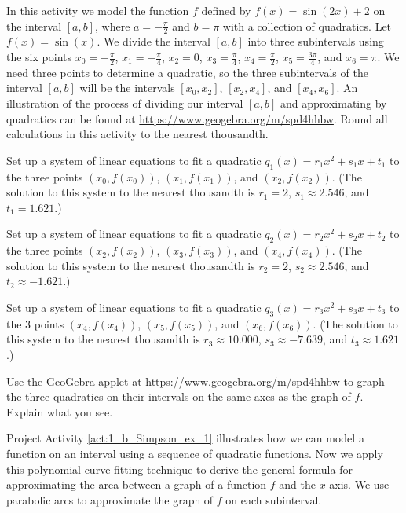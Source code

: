 \begin{pactivity} \label{act:1_b_Simpson_ex_1}  In this activity we model the function $f$ defined by $f(x) = \sin(2x)+2$ on the interval $[a,b]$, where $a = -\frac{\pi}{2}$ and $b = \pi$ with a collection of quadratics. Let $f(x) = \sin(x)$. We divide the interval $[a,b]$ into three subintervals using the six points $x_0 = -\frac{\pi}{2}$, $x_1 = -\frac{\pi}{4}$, $x_2 = 0$, $x_3 = \frac{\pi}{4}$, $x_4 = \frac{\pi}{2}$, $x_5 = \frac{3 \pi}{4}$, and $x_6 = \pi$. We need three points to determine a quadratic, so the three subintervals of the interval $[a,b]$ will be the intervals $[x_0, x_2]$, $[x_2, x_4]$, and $[x_4,x_6]$. An illustration of the process of dividing our interval $[a,b]$ and approximating by quadratics can be found at \url{https://www.geogebra.org/m/spd4hhbw}. Round all calculations in this activity to the nearest thousandth.
	\ba
	\item Set up a system of linear equations to fit a quadratic $q_1(x) = r_1x^2+s_1x+t_1$ to the three points $(x_0, f(x_0))$, $(x_1, f(x_1))$, and $(x_2, f(x_2))$.  (The solution to this system to the nearest thousandth is $r_1 = 2$, $s_1 \approx 2.546$, and $t_1 = 1.621$.) 

	\item Set up a system of linear equations to fit a quadratic $q_2(x) = r_2x^2+s_2x+t_2$ to the three points $(x_2, f(x_2))$, $(x_3, f(x_3))$, and $(x_4, f(x_4))$. (The solution to this system to the nearest thousandth is $r_2 = 2$, $s_2 \approx  2.546$, and $t_2 \approx  -1.621$.)
	
	\item Set up a system of linear equations to fit a quadratic $q_3(x) = r_3x^2+s_3x+t_3$ to the 3 points $(x_4, f(x_4))$, $(x_5, f(x_5))$, and $(x_6, f(x_6))$. (The solution to this system to the nearest thousandth is $r_3 \approx 10.000$, $s_3 \approx  -7.639$, and $t_3 \approx  1.621$.)
	
	\item Use the GeoGebra applet at \url{https://www.geogebra.org/m/spd4hhbw} to graph the three quadratics on their intervals on the same axes as the graph of $f$. Explain what you see.

	\ea
\end{pactivity}  	

Project Activity \ref{act:1_b_Simpson_ex_1} illustrates how we can model a function on an interval using a sequence of quadratic functions. Now we apply this polynomial curve fitting technique to derive the general formula for approximating the area between a graph of a function $f$ and the $x$-axis. We use parabolic arcs to approximate the graph of $f$ on each subinterval. 


